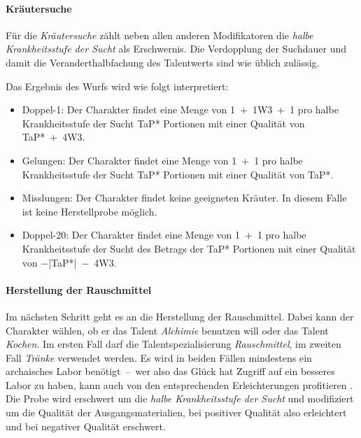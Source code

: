 \paragraph{Kräutersuche}
Für die \emph{Kräutersuche} zählt neben allen anderen Modifikatoren \cite[S.~223/224]{ZBA}\cite[S.~113]{WdE} die \emph{halbe Krankheitsstufe der Sucht} als Erschwernis. Die Verdopplung der Suchdauer und damit die Veranderthalbfachung des Talentwerts sind wie üblich zulässig.

Das Ergebnis des Wurfs wird wie folgt interpretiert:
\begin{itemize}
	\item Doppel-1: Der Charakter findet eine Menge von 1~+~1W3~+~1 pro halbe Krankheitsstufe der Sucht TaP* Portionen mit einer Qualität von TaP*~+~4W3.
	\item Gelungen: Der Charakter findet eine Menge von 1~+~1 pro halbe Krankheitsstufe der Sucht TaP* Portionen mit einer Qualität von TaP*.
	\item Misslungen: Der Charakter findet keine geeigneten Kräuter. In diesem Falle ist keine Herstellprobe möglich.
	\item Doppel-20: Der Charakter findet eine Menge von 1~+~1 pro halbe Krankheitsstufe der Sucht des Betrags der TaP* Portionen mit einer Qualität von −|TaP*|~−~4W3.
\end{itemize}

\paragraph{Herstellung der Rauschmittel}
Im nächsten Schritt geht es an die Herstellung der Rauschmittel. Dabei kann der Charakter wählen, ob er das Talent \emph{Alchimie} benutzen will oder das Talent \emph{Kochen}. Im ersten Fall darf die Talentspezialisierung \emph{Rauschmittel}, im zweiten Fall \emph{Tränke} verwendet werden. Es wird in beiden Fällen mindestens ein archaisches Labor benötigt~--~wer also das Glück hat Zugriff auf ein besseres Labor zu haben, kann auch von den entsprechenden Erleichterungen profitieren \cite[S.~16]{WdA}. Die Probe wird erschwert um die \emph{halbe Krankheitsstufe der Sucht} und modifiziert um die Qualität der Ausgangsmaterialien, bei positiver Qualität also erleichtert und bei negativer Qualität erschwert.

